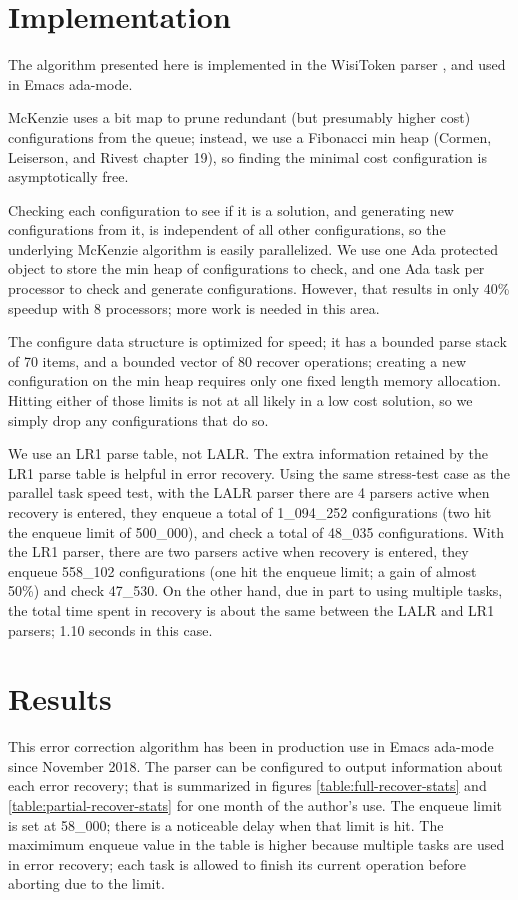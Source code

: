 \documentclass[authordraft]{acmart}
\begin{document}
\section{Implementation}
The algorithm presented here is implemented in the WisiToken parser
\citep{wisitoken}, and used in Emacs ada-mode.

McKenzie uses a bit map to prune redundant (but presumably higher
cost) configurations from the queue; instead, we use a Fibonacci min
heap (Cormen, Leiserson, and Rivest \citet{algorithms_2009} chapter
19), so finding the minimal cost configuration is asymptotically free.

Checking each configuration to see if it is a solution, and generating
new configurations from it, is independent of all other
configurations, so the underlying McKenzie algorithm is easily
parallelized. We use one Ada protected object to store the min heap of
configurations to check, and one Ada task per processor to check and
generate configurations. However, that results in only 40\% speedup
with 8 processors; more work is needed in this area.

The configure data structure is optimized for speed; it has a bounded
parse stack of 70 items, and a bounded vector of 80 recover
operations; creating a new configuration on the min heap requires only
one fixed length memory allocation. Hitting either of those limits is
not at all likely in a low cost solution, so we simply drop any
configurations that do so.

We use an LR1 parse table, not LALR. The extra information retained by
the LR1 parse table is helpful in error recovery. Using the same
stress-test case as the parallel task speed test, with the LALR parser
there are 4 parsers active when recovery is entered, they enqueue a
total of 1\_094\_252 configurations (two hit the enqueue limit of
500\_000), and check a total of 48\_035 configurations. With the LR1
parser, there are two parsers active when recovery is entered, they
enqueue 558\_102 configurations (one hit the enqueue limit; a gain of
almost 50\%) and check 47\_530. On the other hand, due in part to
using multiple tasks, the total time spent in recovery is about the
same between the LALR and LR1 parsers; 1.10 seconds in this case.

\section{Results}
This error correction algorithm has been in production use in Emacs
ada-mode since November 2018. The parser can be configured to output
information about each error recovery; that is summarized in figures
\ref{table:full-recover-stats} and \ref{table:partial-recover-stats} for
one month of the author's use. The enqueue limit is set at 58\_000;
there is a noticeable delay when that limit is hit. The maximimum
enqueue value in the table is higher because multiple tasks are used
in error recovery; each task is allowed to finish its current
operation before aborting due to the limit.
\end{document}
